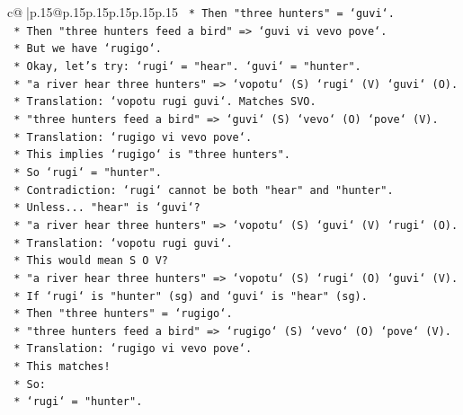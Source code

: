 \documentclass{article}
\begin{document}
{\begin{supertabular}{c@{$\;$}|p{.15\linewidth}@{}p{.15\linewidth}p{.15\linewidth}p{.15\linewidth}p{.15\linewidth}p{.15\linewidth}}
{{{\texttt{                *   Then "three hunters" = `guvi`.} \\
\texttt{                *   Then "three hunters feed a bird" => `guvi vi vevo pove`.} \\
\texttt{                *   But we have `rugigo`.} \\
\texttt{                *   Okay, let's try: `rugi` = "hear". `guvi` = "hunter".} \\
\texttt{                *   "a river hear three hunters" => `vopotu` (S) `rugi` (V) `guvi` (O).} \\
\texttt{                *   Translation: `vopotu rugi guvi`. Matches SVO.} \\
\texttt{                *   "three hunters feed a bird" => `guvi` (S) `vevo` (O) `pove` (V).} \\
\texttt{                *   Translation: `rugigo vi vevo pove`.} \\
\texttt{                *   This implies `rugigo` is "three hunters".} \\
\texttt{                *   So `rugi` = "hunter".} \\
\texttt{                *   Contradiction: `rugi` cannot be both "hear" and "hunter".} \\
\texttt{                *   Unless... "hear" is `guvi`?} \\
\texttt{                *   "a river hear three hunters" => `vopotu` (S) `guvi` (V) `rugi` (O).} \\
\texttt{                *   Translation: `vopotu rugi guvi`.} \\
\texttt{                *   This would mean S O V?} \\
\texttt{                *   "a river hear three hunters" => `vopotu` (S) `rugi` (O) `guvi` (V).} \\
\texttt{                *   If `rugi` is "hunter" (sg) and `guvi` is "hear" (sg).} \\
\texttt{                *   Then "three hunters" = `rugigo`.} \\
\texttt{                *   "three hunters feed a bird" => `rugigo` (S) `vevo` (O) `pove` (V).} \\
\texttt{                *   Translation: `rugigo vi vevo pove`.} \\
\texttt{                *   This matches!} \\
\texttt{                *   So:} \\
\texttt{                    *   `rugi` = "hunter".} \\
}}}
\end{supertabular}}
\end{document}
